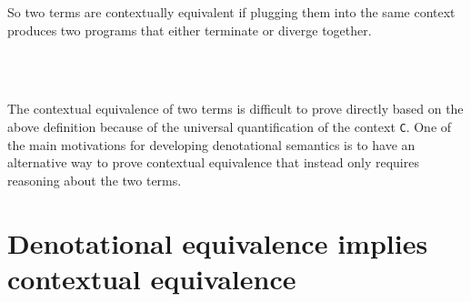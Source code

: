 So two terms are contextually equivalent if plugging them into the same
context produces two programs that either terminate or diverge together.

\begin{fence}
\begin{code}%
\>[0]\AgdaSpace{}%
\AgdaSymbol{:}\AgdaSpace{}%
\AgdaSymbol{\}}\AgdaSpace{}%
\AgdaSpace{}%
\AgdaSymbol{(}\AgdaSpace{}%
\AgdaSpace{}%
\AgdaSymbol{:}\AgdaSpace{}%
\AgdaSpace{}%
\AgdaSpace{}%
\AgdaSymbol{)}\AgdaSpace{}%
\AgdaSpace{}%
\<%
\\
\>[0]\AgdaSymbol{(}\AgdaSpace{}%
\AgdaSymbol{\{}\AgdaSymbol{\}}\AgdaSpace{}%
\AgdaSpace{}%
\AgdaSymbol{)}\AgdaSpace{}%
\AgdaSymbol{=}%
\>[92I]\AgdaSpace{}%
\AgdaSymbol{\{}\AgdaSpace{}%
\AgdaSymbol{:}\AgdaSpace{}%
\AgdaSpace{}%
\AgdaSpace{}%
\AgdaSymbol{\}}\<%
\\
\>[.][@{}l@{}]\<[92I]%
\>[16]\AgdaSpace{}%
\AgdaSymbol{(}\AgdaSpace{}%
\AgdaSymbol{(}\AgdaSpace{}%
\AgdaSpace{}%
\AgdaSymbol{))}\AgdaSpace{}%
\AgdaSpace{}%
\AgdaSymbol{(}\AgdaSpace{}%
\AgdaSymbol{(}\AgdaSpace{}%
\AgdaSpace{}%
\AgdaSymbol{))}\<%
\end{code}
\end{fence}

The contextual equivalence of two terms is difficult to prove directly
based on the above definition because of the universal quantification of
the context \texttt{C}. One of the main motivations for developing
denotational semantics is to have an alternative way to prove contextual
equivalence that instead only requires reasoning about the two terms.

\hypertarget{denotational-equivalence-implies-contextual-equivalence}{%
\section{Denotational equivalence implies contextual
equivalence}\label{denotational-equivalence-implies-contextual-equivalence}}


